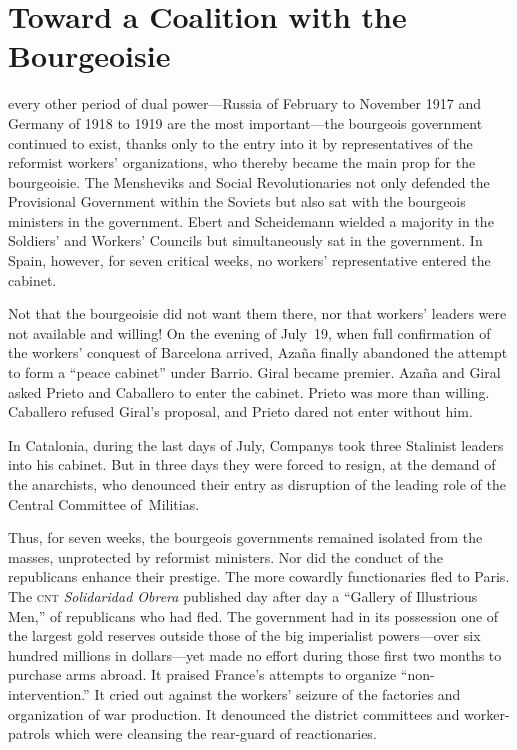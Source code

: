 \chapter{Toward a Coalition with the Bourgeoisie}

 every other period of dual power—Russia of Feb\-ru\-ary to Nov\-em\-ber 1917 and Germany of 1918 to 1919 are the most important—the bourgeois government continued to exist, thanks only to the entry into it by representatives of the reformist workers’ organizations, who thereby became the main prop for the bourgeoisie. The Mensheviks and Social Revolutionaries not only defended the Provisional Government within the Soviets but also sat with the bourgeois ministers in the government. Ebert and Scheidemann wielded a majority in the Soldiers’ and Workers’ Councils but simultaneously sat in the government. In Spain, however, for seven critical weeks, no workers’ representative entered the cabinet.

Not that the bourgeoisie did not want them there, nor that workers’ leaders were not available and willing! On the evening of July~19, when full confirmation of the workers’ conquest of Barcelona arrived, Azaña finally abandoned the attempt to form a ``peace cabinet'' under Barrio. Giral became premier. Azaña and Giral asked Prieto and Caballero to enter the cabinet. Prieto was more than willing. Caballero refused Giral’s proposal, and Prieto dared not enter without him.
\nowidow

In Catalonia, during the last days of July, Companys took three Stalinist leaders into his cabinet. But in three days they were forced to resign, at the demand of the anarchists, who denounced their entry as disruption of the leading role of the Central Committee of~Militias.

Thus, for seven weeks, the bourgeois governments remained isolated from the masses, unprotected by reformist ministers. Nor did the conduct of the republicans enhance their prestige. The more cowardly functionaries fled to Paris. The \textsc{cnt} \emph{Solidaridad Obrera} published day after day a ``Gallery of Illustrious Men,'' of republicans who had fled. The government had in its possession one of the largest gold reserves outside those of the big imperialist powers—over six hundred millions in dollars—yet made no effort during those first two months to purchase arms abroad. It praised France’s attempts to organize ``non-intervention.'' It cried out against the workers’ seizure of the factories and organization of war production. It denounced the district committees and worker-patrols which were cleansing the rear-guard of reactionaries.

